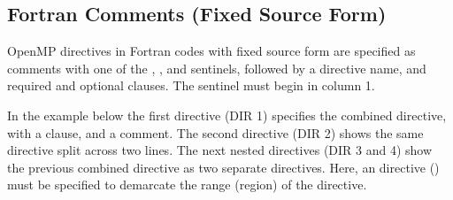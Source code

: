 \begin{fortranspecific}[4ex]
\section{Fortran Comments (Fixed Source Form)}
\label{sec:fortran_fixed_format_comments}

OpenMP directives in Fortran codes with fixed source form are specified as comments with one of the
, , and  sentinels, followed by a
directive name, and required and optional clauses.  The sentinel must begin in column 1.

In the example below the first directive (DIR 1) specifies the %
 combined directive, with a  clause, and a comment.
The second directive (DIR 2) shows the same directive split
across two lines. The next nested directives (DIR 3 and 4) show the previous combined directive as
two separate directives. 
Here, an  directive () must be specified to demarcate the range (region)
of the  directive.

\end{fortranspecific}
